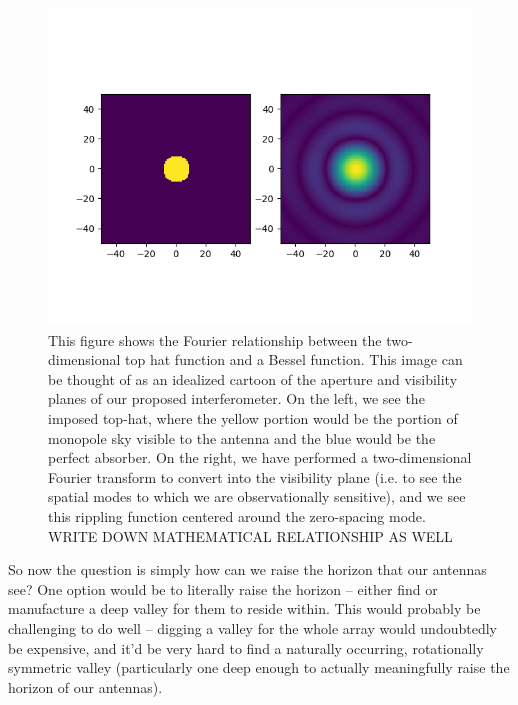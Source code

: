 \begin{figure}
    \begin{center}
    \includegraphics[width=\linewidth]{top-hat-bessel.png}
    \end{center}
    \caption{
        This figure shows the Fourier relationship between the two-dimensional 
        top hat function and a Bessel function. This image can be thought of as 
        an idealized cartoon of the aperture and visibility planes of our 
        proposed interferometer. On the left, we see the imposed top-hat, where 
        the yellow portion would be the portion of monopole sky visible to the 
        antenna and the blue would be the perfect absorber. On the right, we 
        have performed a two-dimensional Fourier transform to convert into the 
        visibility plane (i.e. to see the spatial modes to which we are 
        observationally sensitive), and we see this rippling function centered 
        around the zero-spacing mode.
        WRITE DOWN MATHEMATICAL RELATIONSHIP AS WELL
    }
    \label{fig:sinc}
\end{figure}

So now the question is simply how can we raise the horizon that our antennas 
see? One option would be to literally raise the horizon -- either find or 
manufacture a deep valley for them to reside within. This would probably be 
challenging to do well -- digging a valley for the whole array would 
undoubtedly be expensive, and it'd be very hard to find a naturally occurring, 
rotationally symmetric valley (particularly one deep enough to actually 
meaningfully raise the horizon of our antennas).

